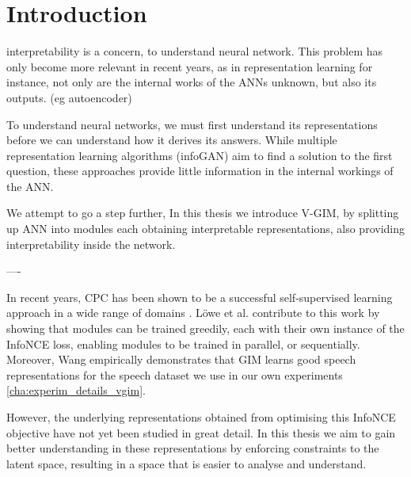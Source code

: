 \chapter{Introduction}

\setcounter{page}{1} %


interpretability is a concern, to understand neural network. This problem has only become more relevant in recent years, as in representation learning for instance, not only are the internal works of the ANNs unknown, but also its outputs. (eg autoencoder)

To understand neural networks, we must first understand its representations before we can understand how it derives its answers. While multiple representation learning algorithms (infoGAN) aim to find a solution to the first question, these approaches provide little information in the internal workings of the ANN.

We attempt to go a step further,
In this thesis we introduce V-GIM, by splitting up ANN into modules each obtaining interpretable representations, also providing interpretability inside the network.

----


In recent years, CPC has been shown to be a successful self-supervised learning approach in a wide range of domains \citep{stackeEvaluationContrastivePredictive2020, dehaanContrastivePredictiveCoding2021, luSemiSupervisedHistologyClassification2019, bhatiSegmentalContrastivePredictive2021b, deldariTimeSeriesChange2021, henaffDataEfficientImageRecognition2020}. Löwe et al. contribute to this work by showing that modules can be trained greedily, each with their own instance of the InfoNCE loss, enabling modules to be trained in parallel, or sequentially. Moreover, Wang \citep{meihanwangSpeechRepresentationLearning2019} empirically demonstrates that GIM learns good speech representations for the speech dataset we use in our own experiments \ref{cha:experim_details_vgim}.

However, the underlying representations obtained from optimising this InfoNCE objective have not yet been studied in great detail. In this thesis we aim to gain better understanding in these representations by enforcing constraints to the latent space, resulting in a space that is easier to analyse and understand.








